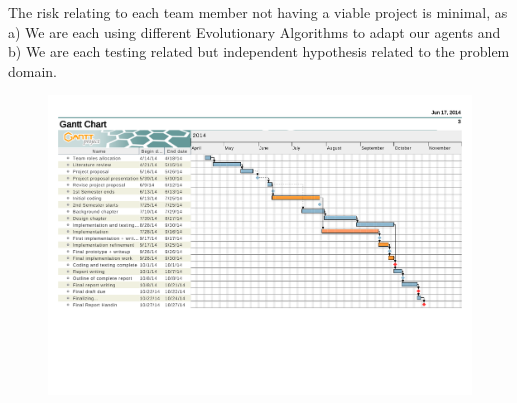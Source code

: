 \documentclass[a4paper,12pt]{article}
\begin{document}
The risk relating to each team member not having a viable project is minimal, as a) We are each using different Evolutionary Algorithms to adapt our agents and b) We are each testing related but independent hypothesis related to the problem domain.



\begin{landscape}
\appendix
\begin{figure}[H]
\centering
\includegraphics[width=\linewidth]{ganttchart}
\end{figure}
\end{landscape}
\end{document}
